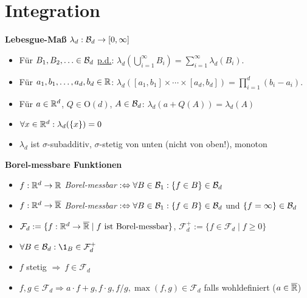 \section{Integration}

\textbf{Lebesgue-Maß} $\lambda_d: \mathcal{B}_{d}\to [0,\infty]$
\begin{itemize}
\item Für $B_1,B_2,\ldots\in\mathcal{B}_{d}$ \underline{p.d.}:
$\lambda_d(\bigcup_{i=1}^{\infty} B_i)=\sum_{i=1}^{\infty}\lambda_d(B_i)$.

\item Für $a_1,b_1,\ldots,a_d,b_d\in\mathbb{R}$:
$\lambda_d([a_1,b_1]\times\cdots\times[a_d,b_d])=\prod_{i=1}^{d}(b_i-a_i)$.

\item Für $a\in\mathbb{R}^d$, $Q\in\mathrm{O}(d)$, $A\in\mathcal{B}_{d}$: 
$\lambda_d(a+Q(A))=\lambda_d(A)$

\item $\forall x\in\mathbb{R}^d: \lambda_d(\{x\})=0$

\item $\lambda_d$ ist $\sigma$-subadditiv, $\sigma$-stetig von unten
(nicht von oben!), monoton
\end{itemize}

\textbf{Borel-messbare Funktionen}
\begin{itemize}
\item $f:\mathbb{R}^d\to\mathbb{R}$ \textit{Borel-messbar}
$:\Leftrightarrow\forall B\in\mathcal{B}_{1}: \{f\in B\}\in\mathcal{B}_{d}$

\item $f:\mathbb{R}^d\to\overline{\mathbb{R}}$ \textit{Borel-messbar}
$:\Leftrightarrow\forall B\in\mathcal{B}_{1}: \{f\in B\}\in\mathcal{B}_{d}$ und $\{f=\infty\}\in\mathcal{B}_{d}$

\item $\mathcal{F}_d:=\{f:\mathbb{R}^d\to\overline{\mathbb{R}}\mid f \text{ ist Borel-messbar}\}$,
$\mathcal{F}_d^+ :=\{f\in\mathcal{F}_d\mid f\geq 0\}$

\item $\forall B\in\B{d}: \1_B\in\mathcal{F}_d^+$

\item $f$ stetig $\Rightarrow\ f\in\mathcal{F}_d$

\item $f,g\in\mathcal{F}_d\Rightarrow a\cdot f+g, f\cdot g, f/g,
\operatorname{max}(f,g)\in\mathcal{F}_d$ falls wohldefiniert ($a\in\overline{\mathbb{R}}$)
\end{itemize}

